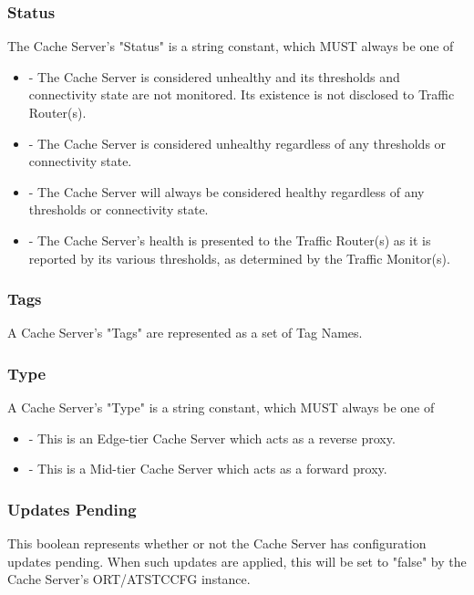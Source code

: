 \subsubsection{Status}
The Cache Server's "Status" is a string constant, which MUST always be one of

\begin{itemize}
	\item {} - The Cache Server is considered unhealthy and its
	thresholds and connectivity state are not monitored. Its existence is not
	disclosed to Traffic Router(s).
	\item {} - The Cache Server is considered unhealthy regardless
	of any thresholds or connectivity state.
	\item {} - The Cache Server will always be considered healthy
	regardless of any thresholds or connectivity state.
	\item {} - The Cache Server's health is presented to the
	Traffic Router(s) as it is reported by its various thresholds, as determined
	by the Traffic Monitor(s).
\end{itemize}

\subsubsection{Tags}
A Cache Server's "Tags" are represented as a set of Tag Names.

\subsubsection{Type}
A Cache Server's "Type" is a string constant, which MUST always be one of

\begin{itemize}
	\item {} - This is an Edge-tier Cache Server which acts as a
	reverse proxy.
	\item {} - This is a Mid-tier Cache Server which acts as a forward
	proxy.
\end{itemize}

\subsubsection{Updates Pending}
This boolean represents whether or not the Cache Server has configuration
updates pending. When such updates are applied, this will be set to "false" by
the Cache Server's ORT/ATSTCCFG instance.

